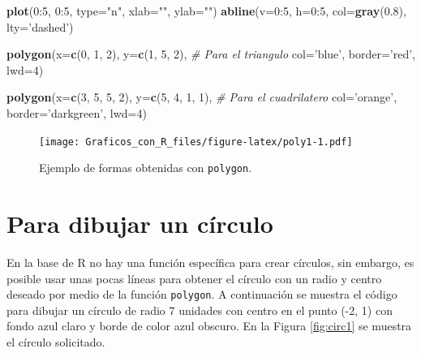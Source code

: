 \documentclass[10pt,]{krantz}
\makeatletter
\newenvironment{Shaded}{\begin{snugshade}}{\end{snugshade}}
\newcommand{\KeywordTok}[1]{\textcolor[rgb]{0.13,0.29,0.53}{\textbf{{#1}}}}
\newcommand{\DataTypeTok}[1]{\textcolor[rgb]{0.13,0.29,0.53}{{#1}}}
\newcommand{\DecValTok}[1]{\textcolor[rgb]{0.00,0.00,0.81}{{#1}}}
\newcommand{\FloatTok}[1]{\textcolor[rgb]{0.00,0.00,0.81}{{#1}}}
\newcommand{\StringTok}[1]{\textcolor[rgb]{0.31,0.60,0.02}{{#1}}}
\newcommand{\CommentTok}[1]{\textcolor[rgb]{0.56,0.35,0.01}{\textit{{#1}}}}
\newcommand{\NormalTok}[1]{{#1}}
\let\proglang=\textsf
\newenvironment{kframe}{%
\medskip{}
\setlength{\fboxsep}{.8em}
 \def\at@end@of@kframe{}%
 \ifinner\ifhmode%
  \def\at@end@of@kframe{\end{minipage}}%
  \begin{minipage}{\columnwidth}%
 \fi\fi%
 \def\FrameCommand##1{\hskip\@totalleftmargin \hskip-\fboxsep
 \colorbox{shadecolor}{##1}\hskip-\fboxsep
     \hskip-\linewidth \hskip-\@totalleftmargin \hskip\columnwidth}%
 \MakeFramed {\advance\hsize-\width
   \@totalleftmargin\z@ \linewidth\hsize
   \@setminipage}}%
 {\par\unskip\endMakeFramed%
 \at@end@of@kframe}
\renewenvironment{Shaded}{\begin{kframe}}{\end{kframe}}
\makeatother
\begin{document}
\begin{Shaded}
\begin{Highlighting}[]
\KeywordTok{plot}\NormalTok{(}\DecValTok{0}\NormalTok{:}\DecValTok{5}\NormalTok{, }\DecValTok{0}\NormalTok{:}\DecValTok{5}\NormalTok{, }\DataTypeTok{type=}\StringTok{"n"}\NormalTok{, }\DataTypeTok{xlab=}\StringTok{""}\NormalTok{, }\DataTypeTok{ylab=}\StringTok{""}\NormalTok{)}
\KeywordTok{abline}\NormalTok{(}\DataTypeTok{v=}\DecValTok{0}\NormalTok{:}\DecValTok{5}\NormalTok{, }\DataTypeTok{h=}\DecValTok{0}\NormalTok{:}\DecValTok{5}\NormalTok{, }\DataTypeTok{col=}\KeywordTok{gray}\NormalTok{(}\FloatTok{0.8}\NormalTok{), }\DataTypeTok{lty=}\StringTok{'dashed'}\NormalTok{)}

\KeywordTok{polygon}\NormalTok{(}\DataTypeTok{x=}\KeywordTok{c}\NormalTok{(}\DecValTok{0}\NormalTok{, }\DecValTok{1}\NormalTok{, }\DecValTok{2}\NormalTok{), }\DataTypeTok{y=}\KeywordTok{c}\NormalTok{(}\DecValTok{1}\NormalTok{, }\DecValTok{5}\NormalTok{, }\DecValTok{2}\NormalTok{),         }\CommentTok{# Para el triangulo}
        \DataTypeTok{col=}\StringTok{'blue'}\NormalTok{, }\DataTypeTok{border=}\StringTok{'red'}\NormalTok{, }\DataTypeTok{lwd=}\DecValTok{4}\NormalTok{)}

\KeywordTok{polygon}\NormalTok{(}\DataTypeTok{x=}\KeywordTok{c}\NormalTok{(}\DecValTok{3}\NormalTok{, }\DecValTok{5}\NormalTok{, }\DecValTok{5}\NormalTok{, }\DecValTok{2}\NormalTok{), }\DataTypeTok{y=}\KeywordTok{c}\NormalTok{(}\DecValTok{5}\NormalTok{, }\DecValTok{4}\NormalTok{, }\DecValTok{1}\NormalTok{, }\DecValTok{1}\NormalTok{), }\CommentTok{# Para el cuadrilatero}
        \DataTypeTok{col=}\StringTok{'orange'}\NormalTok{, }\DataTypeTok{border=}\StringTok{'darkgreen'}\NormalTok{, }\DataTypeTok{lwd=}\DecValTok{4}\NormalTok{)}
\end{Highlighting}
\end{Shaded}

\begin{figure}[htbp]
\centering
\texttt{[image: Graficos\_con\_R\_files/figure-latex/poly1-1.pdf]}
\caption{\label{fig:poly1}Ejemplo de formas obtenidas con \texttt{polygon}.}
\end{figure}

\section{\texorpdfstring{Para dibujar un círculo
}{Para dibujar un círculo }}\label{para-dibujar-un-circulo}

En la base de \proglang{R} no hay una función específica para crear
círculos, sin embargo, es posible usar unas pocas líneas para obtener el
círculo con un radio y centro deseado por medio de la función
\texttt{polygon}. A continuación se muestra el código para dibujar un
círculo de radio 7 unidades con centro en el punto (-2, 1) con fondo
azul claro y borde de color azul obscuro. En la Figura \ref{fig:circ1}
se muestra el círculo solicitado.
\end{document}

